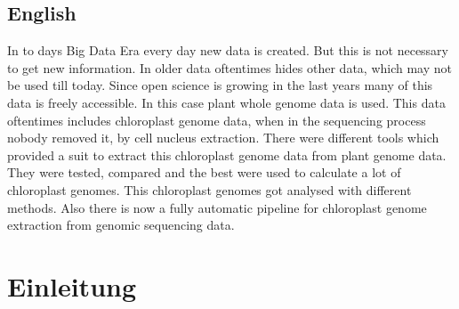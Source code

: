 \documentclass{scrartcl}
\begin{document}
\subsection{English}
\label{sec-1-2}
In to days Big Data Era every day new data is created. But this is not necessary to get new information. In older data oftentimes hides other data, which may not be used till today.
Since open science is growing in the last years many of this data is freely accessible. In this case plant whole genome data is used. This data oftentimes includes chloroplast
genome data, when in the sequencing process nobody removed it, by cell nucleus extraction. There were different tools which provided a suit to extract this chloroplast genome data from plant
genome data. They were tested, compared and the best were used to calculate a lot of chloroplast genomes. This chloroplast genomes got analysed with different methods. Also there is now
a fully automatic pipeline for chloroplast genome extraction from genomic sequencing data.
\clearpage

\section{Einleitung}
\label{sec-2}
\end{document}

